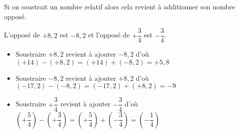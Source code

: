 \begin{propriete}
    Si on soustrait un nombre relatif alors cela revient à additionner son nombre opposé.
\end{propriete}

\begin{exemple*1}
    L'opposé de $+8,2$ est $-8,2$ et l'opposé de $+\dfrac34$ est $-\dfrac34$.
    \begin{itemize}
        \item Soustraire $+8,2$ revient à ajouter $-8,2$ d'où $(+14)-(+8,2)=(+14)+(-8,2)=+5,8$
        \item Soustraire $-8,2$ revient à ajouter $+8,2$ d'où $(-17,2)-(-8,2)=(-17,2)+(+8,2)=-9$
        \item Soustraire $+\dfrac34$ revient à ajouter $-\dfrac34$ d'où $\left(+\dfrac54\right) -\left(+\dfrac34\right)=\left(+\dfrac54\right) +\left(-\dfrac34\right)=\left(-\dfrac14\right)$
    \end{itemize}
\end{exemple*1}